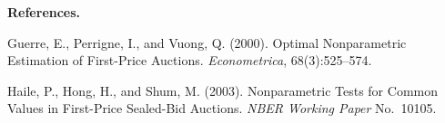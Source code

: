 \documentclass[11pt]{article}
\begin{document}









\vspace{0.5cm}

\noindent\textbf{References.}

\smallskip




\noindent Guerre, E., Perrigne, I., and Vuong, Q. (2000). Optimal Nonparametric Estimation of First-Price Auctions. \textit{Econometrica}, 68(3):525--574.

\noindent Haile, P., Hong, H., and Shum, M. (2003). Nonparametric Tests for Common Values in First-Price Sealed-Bid Auctions. \textit{NBER Working Paper} No.\ 10105.
\end{document}
